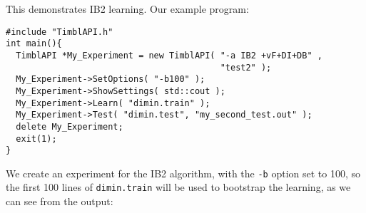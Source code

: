 \documentclass{report}
\begin{document}
This demonstrates IB2 learning. Our example program:

\begin{footnotesize}
\begin{verbatim}
#include "TimblAPI.h"
int main(){
  TimblAPI *My_Experiment = new TimblAPI( "-a IB2 +vF+DI+DB" , 
                                          "test2" );
  My_Experiment->SetOptions( "-b100" );
  My_Experiment->ShowSettings( std::cout );
  My_Experiment->Learn( "dimin.train" );  
  My_Experiment->Test( "dimin.test", "my_second_test.out" );
  delete My_Experiment;
  exit(1);
}
\end{verbatim}
\end{footnotesize}

We create an experiment for the IB2 algorithm, with the {\tt -b} option set
to 100, so the first 100 lines of {\tt dimin.train} will be used to
bootstrap the learning, as we can see from the output:
\end{document}
